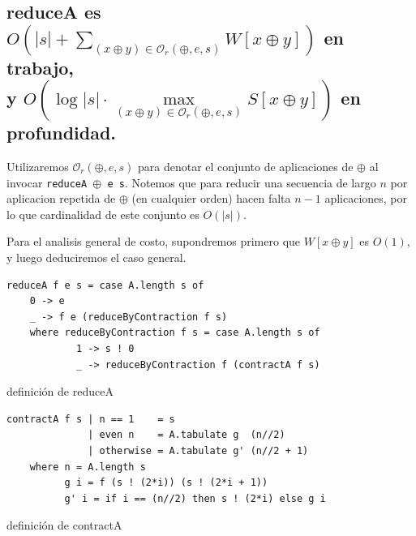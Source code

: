 \documentclass[12pt]{article}
\begin{document}
\subsection{reduceA es $O(|s| + \sum\limits_{(x\oplus y)\in\mathcal{O}_r(\oplus,e,s)} W[x\oplus y])$ en trabajo,\\
y $ O(\log |s|\cdot \max\limits_{(x\oplus y)\in\mathcal{O}_r(\oplus,e,s)} S[x\oplus y])$ en profundidad.}

Utilizaremos $\mathcal{O}_r(\oplus,e,s)$ para denotar el conjunto de aplicaciones de $\oplus$ al invocar \texttt{reduceA $\oplus$ e s}. Notemos que para reducir una secuencia de largo $n$ por aplicacion repetida de $\oplus$ (en cualquier orden) hacen falta $n-1$ aplicaciones, por lo que cardinalidad de este conjunto es $O(|s|)$.

Para el analisis general de costo, supondremos primero que $W[x \oplus y]$ es $O(1)$, y luego deduciremos el caso general.

\begin{table}[h!]
\begin{lstlisting}
reduceA f e s = case A.length s of
    0 -> e
    _ -> f e (reduceByContraction f s)
    where reduceByContraction f s = case A.length s of
            1 -> s ! 0
            _ -> reduceByContraction f (contractA f s)
\end{lstlisting}
\caption{definición de reduceA}
\end{table}

\begin{table}[h!]
\begin{lstlisting}
contractA f s | n == 1    = s
              | even n    = A.tabulate g  (n//2)
              | otherwise = A.tabulate g' (n//2 + 1)
    where n = A.length s
          g i = f (s ! (2*i)) (s ! (2*i + 1))
          g' i = if i == (n//2) then s ! (2*i) else g i
\end{lstlisting}
\caption{definición de contractA}
\end{table}
\end{document}
